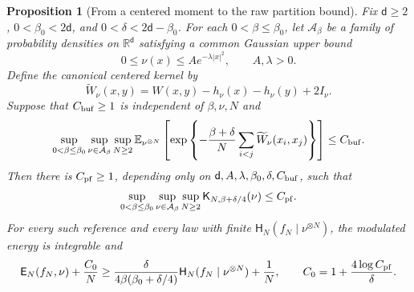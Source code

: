\documentclass[11pt,reqno]{amsart}
\numberwithin{equation}{section}
\newtheorem{proposition}[proposition]{Proposition}
\theoremstyle{definition}
\theoremstyle{remark}
\newcommand{\R}{\mathbb R}
\newcommand{\E}{\mathbb E}
\renewcommand{\d}{\mathsf d}
\newcommand{\Hr}{\mathsf H}
\newcommand{\Er}{\mathsf E}
\newcommand{\K}{\mathsf K}
\begin{document}
\begin{proposition}[From a centered moment to the raw partition bound]\label{prop:confined-buffer-transfer}
Fix $\d\geq2$, $0<\beta_0<2\d$, and $0<\delta<2\d-\beta_0$. For each $0<\beta\leq\beta_0$, let $\mathcal A_\beta$ be a family of probability densities on $\R^\d$ satisfying a common Gaussian upper bound
\begin{equation}\label{eq:confined-gaussian-envelope}
 0\leq\nu(x)\leq A e^{-\lambda|x|^2},\qquad A,\lambda>0.
\end{equation}
Define the canonical centered kernel by
\begin{equation}\label{eq:confined-centered-W}
 \widetilde W_\nu(x,y)=W(x,y)-h_\nu(x)-h_\nu(y)+2I_\nu.
\end{equation}
Suppose that $C_{\rm buf}\geq1$ is independent of $\beta,\nu,N$ and
\begin{equation}\label{eq:confined-centered-buffer}
 \sup_{0<\beta\leq\beta_0}\sup_{\nu\in\mathcal A_\beta}\sup_{N\geq2}
 \E_{\nu^{\otimes N}}\left[
 \exp\left\{-\frac{\beta+\delta}{N}
                    \sum_{i<j}\widetilde W_\nu(x_i,x_j)\right\}\right]
 \leq C_{\rm buf}.
\end{equation}
Then there is $C_{\rm pf}\geq1$, depending only on $\d,A,\lambda,\beta_0,\delta,C_{\rm buf}$, such that
\begin{equation}\label{eq:confined-raw-buffer}
 \sup_{0<\beta\leq\beta_0}\sup_{\nu\in\mathcal A_\beta}\sup_{N\geq2}
 \K_{N,\beta+\delta/4}(\nu)\leq C_{\rm pf}.
\end{equation}
For every such reference and every law with finite $\Hr_N(f_N\mid\nu^{\otimes N})$, the modulated energy is integrable and
\begin{equation}\label{eq:confined-uniform-coercivity}
 \Er_N(f_N,\nu)+\frac{C_0}{N}
 \geq\frac{\delta}{4\beta(\beta_0+\delta/4)}\Hr_N(f_N\mid\nu^{\otimes N})
       +\frac1N,
 \qquad C_0=1+\frac{4\log C_{\rm pf}}{\delta}.
\end{equation}
\end{proposition}
\end{document}
